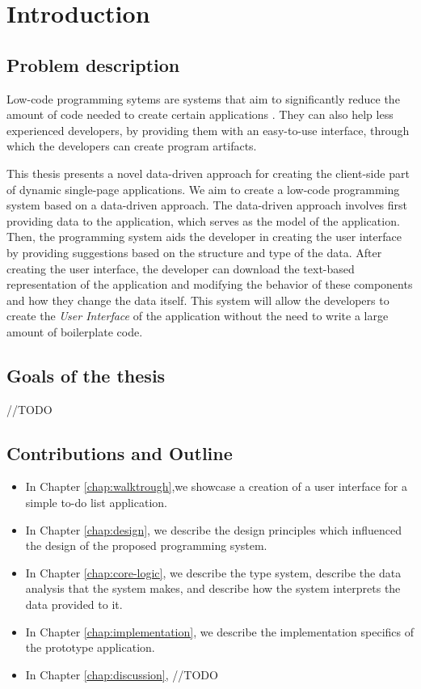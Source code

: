 \chapter*{Introduction}

\section*{Problem description}
Low-code programming sytems are systems that aim to significantly reduce the amount of code needed to create certain applications \cite{Pinho_Aguiar_Amaral_2023}.
They can also help less experienced developers, by providing them with an easy-to-use interface, through which the developers can create program artifacts.

This thesis presents a novel data-driven approach for creating the client-side part of dynamic single-page applications.
We aim to create a low-code programming system based on a data-driven approach.
The data-driven approach involves first providing data to the application, which serves as the model of the application.
Then, the programming system aids the developer in creating the user interface by providing suggestions based on the structure and type of the data.
After creating the user interface, the developer can download the text-based representation of the application and modifying the behavior of these components and how they change the data itself.
This system will allow the developers to create the \emph{User Interface} of the application without the need to write a large amount of boilerplate code.

\section*{Goals of the thesis}
//TODO

\section* {Contributions and Outline}
\begin{itemize}
	\item In Chapter \ref{chap:walktrough},we showcase a creation of a user interface for a simple to-do list application.
	\item In Chapter \ref{chap:design}, we describe the design principles which influenced the design of the proposed programming system.
	\item In Chapter \ref{chap:core-logic}, we describe the type system, describe the data analysis that the system makes, and describe how the system interprets the data provided to it.
	\item In Chapter \ref{chap:implementation}, we describe the implementation specifics of the prototype application.
	\item In Chapter \ref{chap:discussion}, //TODO
\end{itemize}
